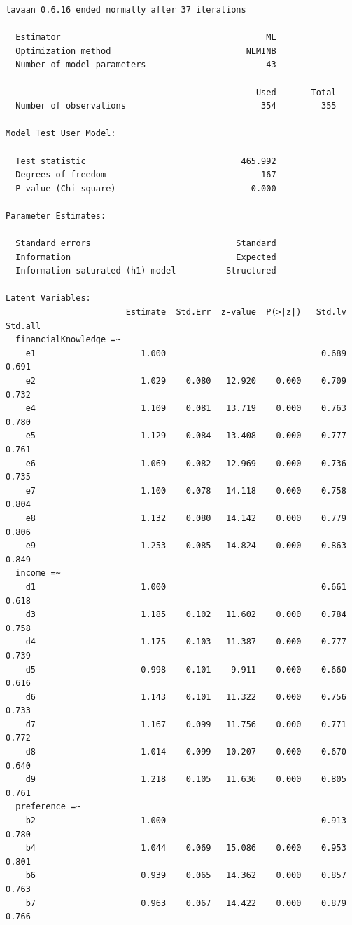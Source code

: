 \documentclass[
  super,
  preprint,
  3p]{elsarticle}
\begin{document}
\begin{verbatim}
lavaan 0.6.16 ended normally after 37 iterations

  Estimator                                         ML
  Optimization method                           NLMINB
  Number of model parameters                        43

                                                  Used       Total
  Number of observations                           354         355

Model Test User Model:
                                                      
  Test statistic                               465.992
  Degrees of freedom                               167
  P-value (Chi-square)                           0.000

Parameter Estimates:

  Standard errors                             Standard
  Information                                 Expected
  Information saturated (h1) model          Structured

Latent Variables:
                        Estimate  Std.Err  z-value  P(>|z|)   Std.lv  Std.all
  financialKnowledge =~                                                      
    e1                     1.000                               0.689    0.691
    e2                     1.029    0.080   12.920    0.000    0.709    0.732
    e4                     1.109    0.081   13.719    0.000    0.763    0.780
    e5                     1.129    0.084   13.408    0.000    0.777    0.761
    e6                     1.069    0.082   12.969    0.000    0.736    0.735
    e7                     1.100    0.078   14.118    0.000    0.758    0.804
    e8                     1.132    0.080   14.142    0.000    0.779    0.806
    e9                     1.253    0.085   14.824    0.000    0.863    0.849
  income =~                                                                  
    d1                     1.000                               0.661    0.618
    d3                     1.185    0.102   11.602    0.000    0.784    0.758
    d4                     1.175    0.103   11.387    0.000    0.777    0.739
    d5                     0.998    0.101    9.911    0.000    0.660    0.616
    d6                     1.143    0.101   11.322    0.000    0.756    0.733
    d7                     1.167    0.099   11.756    0.000    0.771    0.772
    d8                     1.014    0.099   10.207    0.000    0.670    0.640
    d9                     1.218    0.105   11.636    0.000    0.805    0.761
  preference =~                                                              
    b2                     1.000                               0.913    0.780
    b4                     1.044    0.069   15.086    0.000    0.953    0.801
    b6                     0.939    0.065   14.362    0.000    0.857    0.763
    b7                     0.963    0.067   14.422    0.000    0.879    0.766


\end{verbatim}
\end{document}
